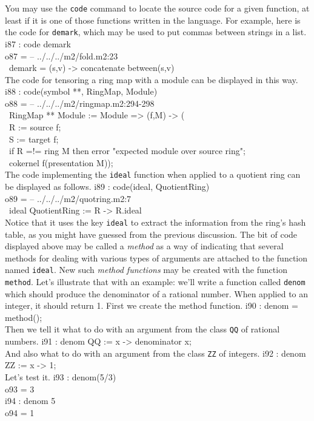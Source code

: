 You may use the \texttt{code} command to locate the source code for a given
function, at least if it is one of those functions written in the \Mtwo
language.  For example, here is the code for {\tt demark}, which may be used
to put commas between strings in a list.
\beginOutput
i87 : code demark\\
\emptyLine
o87 = -- ../../../m2/fold.m2:23\\
\      demark = (s,v) -> concatenate between(s,v)\\
\endOutput
The code for tensoring a ring map with a module can be displayed in this way.
\beginOutput
i88 : code(symbol **, RingMap, Module)\\
\emptyLine
o88 = -- ../../../m2/ringmap.m2:294-298\\
\      RingMap ** Module := Module => (f,M) -> (\\
\           R := source f;\\
\           S := target f;\\
\           if R =!= ring M then error "expected module over source ring";\\
\           cokernel f(presentation M));\\
\endOutput
{}
The code implementing the {\tt ideal} function when applied to a
quotient ring can be displayed as follows.
\beginOutput
i89 : code(ideal, QuotientRing)\\
\emptyLine
o89 = -- ../../../m2/quotring.m2:7\\
\      ideal QuotientRing := R -> R.ideal\\
\endOutput
Notice that it uses the key {\tt ideal} to extract the information from the
ring's hash table, as you might have guessed from the previous discussion.
The bit of code displayed above may be called a {\sl method} as
a way of indicating that several methods for dealing with various types of
arguments are attached to the function named {\tt ideal}.  New such {\sl
  method functions} may be created with the function {\tt method}.  Let's
illustrate that with an example: we'll write a function called {\tt denom}
which should produce the denominator of a rational number.  When applied to
an integer, it should return 1.  First we create the method function.
\beginOutput
i90 : denom = method();\\
\endOutput
Then we tell it what to do with an argument from the class {\tt QQ} of rational numbers.
\beginOutput
i91 : denom QQ := x -> denominator x;\\
\endOutput
And also what to do with an argument from the class {\tt ZZ} of integers.
\beginOutput
i92 : denom ZZ := x -> 1;\\
\endOutput
Let's test it.
\beginOutput
i93 : denom(5/3)\\
\emptyLine
o93 = 3\\
\endOutput
\beginOutput
i94 : denom 5\\
\emptyLine
o94 = 1\\
\endOutput

